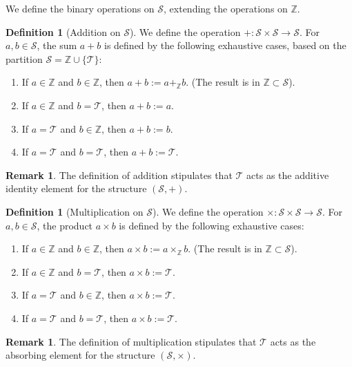 \documentclass[11pt, a4paper]{article}
\theoremstyle{plain}
\theoremstyle{definition}
\newtheorem{definition}[theorem]{Definition}
\newtheorem{remark}[theorem]{Remark}
\numberwithin{equation}{section}
\newcommand{\Z}{\mathbb{Z}}
\newcommand{\Tobj}{\mathcal{T}} %
\newcommand{\SemiringS}{\mathcal{S}}
\begin{document}
We define the binary operations on $\SemiringS$, extending the operations on $\Z$.

\begin{definition}[Addition on $\SemiringS$]\label{def:addition_S}
We define the operation $+: \SemiringS \times \SemiringS \to \SemiringS$. For $a, b \in \SemiringS$, the sum $a+b$ is defined by the following exhaustive cases, based on the partition $\SemiringS = \Z \cup \{\Tobj\}$:
\begin{enumerate}
    \item If $a \in \Z$ and $b \in \Z$, then $a+b := a+_{\Z} b$. (The result is in $\Z \subset \SemiringS$).
    \item If $a \in \Z$ and $b=\Tobj$, then $a+b := a$.
    \item If $a=\Tobj$ and $b \in \Z$, then $a+b := b$.
    \item If $a=\Tobj$ and $b=\Tobj$, then $a+b := \Tobj$.
\end{enumerate}
\end{definition}

\begin{remark}
The definition of addition stipulates that $\Tobj$ acts as the additive identity element for the structure $(\SemiringS, +)$.
\end{remark}

\begin{definition}[Multiplication on $\SemiringS$]\label{def:multiplication_S}
We define the operation $\times: \SemiringS \times \SemiringS \to \SemiringS$. For $a, b \in \SemiringS$, the product $a\times b$ is defined by the following exhaustive cases:
\begin{enumerate}
    \item If $a \in \Z$ and $b \in \Z$, then $a\times b := a\times_{\Z} b$. (The result is in $\Z \subset \SemiringS$).
    \item If $a \in \Z$ and $b=\Tobj$, then $a\times b := \Tobj$.
    \item If $a=\Tobj$ and $b \in \Z$, then $a\times b := \Tobj$.
    \item If $a=\Tobj$ and $b=\Tobj$, then $a\times b := \Tobj$.
\end{enumerate}
\end{definition}

\begin{remark}
The definition of multiplication stipulates that $\Tobj$ acts as the absorbing element for the structure $(\SemiringS, \times)$.
\end{remark}
\end{document}
